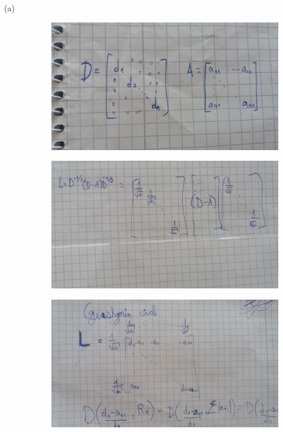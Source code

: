 \documentclass[14pt]{article}
\begin{document}
\begin{description}
\item[(a)]
\begin{figure}[h]
  \includegraphics[scale=0.35, angle=90]{a10-ex1-a1.jpeg}
\end{figure}
\begin{figure}[h]
  \includegraphics[scale=0.35, angle=90]{a10-ex1-a2.jpeg}
\end{figure}
\begin{figure}[h]
  \includegraphics[scale=0.35, angle=90]{a10-ex1-a3.jpeg}

\end{figure}
\end{description}
\end{document}
